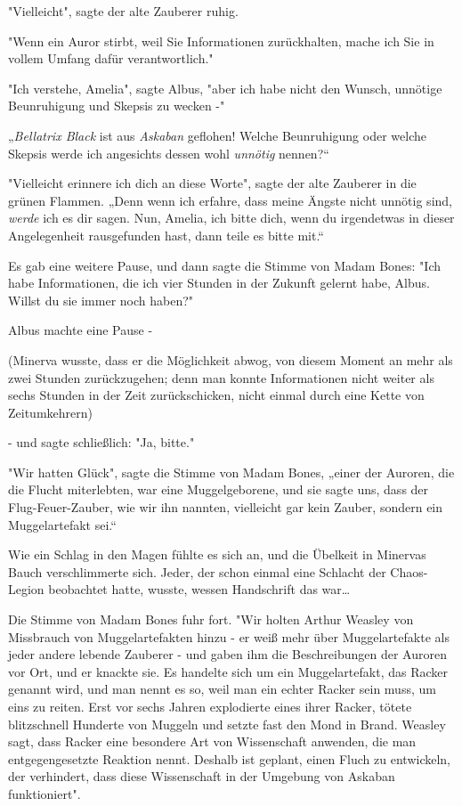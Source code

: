 {"Vielleicht", sagte der alte Zauberer ruhig.

"Wenn ein Auror stirbt, weil Sie Informationen zurückhalten, mache ich Sie in vollem Umfang dafür verantwortlich."

"Ich verstehe, Amelia", sagte Albus, "aber ich habe nicht den Wunsch, unnötige Beunruhigung und Skepsis zu wecken -"

„\emph{Bellatrix Black} ist aus \emph{Askaban} geflohen! Welche Beunruhigung oder welche Skepsis werde ich angesichts dessen wohl \emph{unnötig} nennen?“

"Vielleicht erinnere ich dich an diese Worte", sagte der alte Zauberer in die grünen Flammen. „Denn wenn ich erfahre, dass meine Ängste nicht unnötig sind, \emph{werde} ich es dir sagen. Nun, Amelia, ich bitte dich, wenn du irgendetwas in dieser Angelegenheit rausgefunden hast, dann teile es bitte mit.“

Es gab eine weitere Pause, und dann sagte die Stimme von Madam Bones: "Ich habe Informationen, die ich vier Stunden in der Zukunft gelernt habe, Albus. Willst du sie immer noch haben?"

Albus machte eine Pause -

(Minerva wusste, dass er die Möglichkeit abwog, von diesem Moment an mehr als zwei Stunden zurückzugehen; denn man konnte Informationen nicht weiter als sechs Stunden in der Zeit zurückschicken, nicht einmal durch eine Kette von Zeitumkehrern)

- und sagte schließlich: "Ja, bitte."

"Wir hatten Glück", sagte die Stimme von Madam Bones, „einer der Auroren, die die Flucht miterlebten, war eine Muggelgeborene, und sie sagte uns, dass der Flug-Feuer-Zauber, wie wir ihn nannten, vielleicht gar kein Zauber, sondern ein Muggelartefakt sei.“

Wie ein Schlag in den Magen fühlte es sich an, und die Übelkeit in Minervas Bauch verschlimmerte sich. Jeder, der schon einmal eine Schlacht der Chaos-Legion beobachtet hatte, wusste, wessen Handschrift das war…

Die Stimme von Madam Bones fuhr fort. "Wir holten Arthur Weasley von Missbrauch von Muggelartefakten hinzu - er weiß mehr über Muggelartefakte als jeder andere lebende Zauberer - und gaben ihm die Beschreibungen der Auroren vor Ort, und er knackte sie. Es handelte sich um ein Muggelartefakt, das Racker genannt wird, und man nennt es so, weil man ein echter Racker sein muss, um eins zu reiten. Erst vor sechs Jahren explodierte eines ihrer Racker, tötete blitzschnell Hunderte von Muggeln und setzte fast den Mond in Brand. Weasley sagt, dass Racker eine besondere Art von Wissenschaft anwenden, die man entgegengesetzte Reaktion nennt. Deshalb ist geplant, einen Fluch zu entwickeln, der verhindert, dass diese Wissenschaft in der Umgebung von Askaban funktioniert".

}
